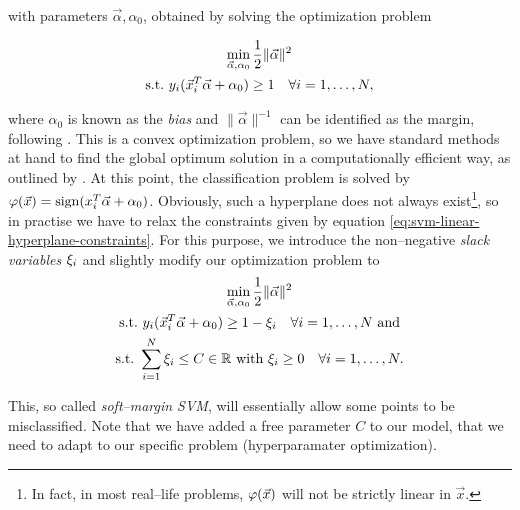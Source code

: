with parameters $\vec \alpha, \alpha_0$, obtained by solving the optimization problem

\begin{gather}
\label{eq:svm-linear-hyperplane}
\min_{\vec \alpha, \alpha_0} \frac{1}{2} \| \vec \alpha \|^2 \\
\label{eq:svm-linear-hyperplane-constraints}
\text{\st} y_i (\vec x_i^T \vec \alpha + \alpha_0) \ge 1 \quad \forall i = 1, \ldots, N,
\end{gather}

where $\alpha_0$ is known as the \emph{bias} and $\|\vec \alpha \|^{-1}$ can be identified as the margin, following \citet{hastie2001}. This is a convex optimization problem, so we have standard methods at hand to find the global optimum solution in a computationally efficient way, as outlined by \citet{vanderplas2015}. At this point, the classification problem is solved by $\varphi(\vec x) = \operatorname{sign}(x_i^T \vec \alpha + \alpha_0)$. Obviously, such a hyperplane does not always exist\footnote{In fact, in most real--life problems, $\varphi(\vec x)$ will not be strictly linear in $\vec x$.}, so in practise we have to relax the constraints given by equation \eqref{eq:svm-linear-hyperplane-constraints}. For this purpose, we introduce the non--negative \emph{slack variables} $\xi_i$ and slightly modify our optimization problem to \\


\begin{gather}
\label{eq:svm-linear-hyperplane-relaxed}
\min_{\vec \alpha, \alpha_0} \frac{1}{2} \| \vec \alpha \|^2 \\
\text{\st} y_i (\vec x_i^T \vec \alpha + \alpha_0) \ge 1 - \slack_i \quad \forall i = 1, \ldots, N \text{\ and} \\
\text{\st} \sum\limits_{i=1}^{N} \slack_i \le C \in \mathbb{R} \text{\ with\ } \slack_i \ge 0 \quad \forall i = 1, \ldots, N.
\end{gather}

This, so called \emph{soft--margin SVM}, will essentially allow some points to be misclassified. Note that we have added a free parameter $C$ to our model, that we need to adapt to our specific problem (hyperparamater optimization).\\

